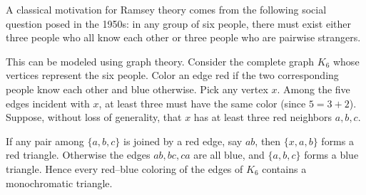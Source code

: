 \documentclass[11pt, a4paper]{ctexrep}
\begin{document}
A classical motivation for Ramsey theory comes from the following social
question posed in the 1950s: in any group of six people, there must exist
either three people who all know each other or three people who are
pairwise strangers.

This can be modeled using graph theory. Consider the complete graph
$K_6$ whose vertices represent the six people. Color an edge red if the
two corresponding people know each other and blue otherwise. Pick any
vertex $x$. Among the five edges incident with $x$, at least three must
have the same color (since $5=3+2$). Suppose, without loss of generality,
that $x$ has at least three red neighbors $a,b,c$.
\begin{center}
\end{center}

If any pair among $\{a,b,c\}$ is joined by a red edge, say $ab$, then
$\{x,a,b\}$ forms a red triangle. Otherwise the edges $ab,bc,ca$ are all
blue, and $\{a,b,c\}$ forms a blue triangle. Hence every red--blue
coloring of the edges of $K_6$ contains a monochromatic triangle.
\begin{center}
    \hspace{2cm}
\end{center}
\end{document}
